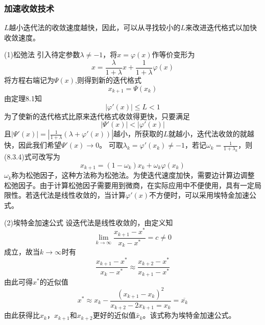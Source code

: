 \subsubsection{加速收敛技术}

$L$越小迭代法的收敛速度越快，因此，可以从寻找较小的$L$来改进迭代格式以加快收敛速度。

(1)松弛法
引入待定参数$\lambda \neq -1$，将$x = \varphi(x)$作等价变形为
\begin{equation}
    x = \frac{\lambda}{1+\lambda}x+\frac{1}{1+\lambda}\varphi(x)
\end{equation}
将方程右端记为$\varPsi(x)$,则得到新的迭代格式
\begin{equation*}
    x_{k+1} = \varPsi(x_k)
\end{equation*}
由定理8.1知
\begin{equation*}
    |\varphi'(x)| \leq L < 1
\end{equation*}
为了使新的迭代格式比原来迭代格式收敛得更快，只要满足
\begin{equation*}
    |\varPsi'(x)|<|\varphi'(x)|
\end{equation*}
且$|\varPsi'(x)| = |\frac{1}{1+\lambda}(\lambda+\varphi'(x))|$越小，所获取的$L$就越小，迭代法收敛的就越快，因此我们希望$\varPsi'(x) \rightarrow 0$。
可取$\lambda_k = \varphi'(x_k) \neq -1$，若记$\omega_k = \frac{1}{1+\lambda_k}$，则(8.3.4)式可改写为
\begin{equation*}
    x_{k+1} = (1-\omega_k)x_k+\omega_k\varphi(x_k)
\end{equation*}
$\omega_k$称为松弛因子，这种方法称为松弛法。为使迭代速度加快，需要边计算边调整松弛因子。由于计算松弛因子需要用到微商，在实际应用中不便使用，具有一定局限性。若迭代法是线性收敛的，当计算$\varphi'(x)$不方便时，可以采用埃特金加速公式。

(2)埃特金加速公式
设迭代法是线性收敛的，由定义知
\begin{equation*}
    \lim_{k \to \infty}\frac{x_{k+1}-x^*}{x_k-x^*}=c \neq 0
\end{equation*}
成立，故当$k \to \infty$时有
\begin{equation*}
    \frac{x_{k+1}-x^*}{x_k-x^*} \approx \frac{x_{k+2}-x^*}{x_{k+1}-x^*}
\end{equation*}
由此可得$x^*$的近似值
\begin{equation}
    x^* \approx x_k-\frac{(x_{k+1}-x_k)^2}{x_{k+2}-2x_{k+1}=x_k} = \overline{x_k}
\end{equation}
由此获得比$x_k$，$x_{k+1}$和$x_{k+2}$更好的近似值$\bar{x}_k$。该式称为埃特金加速公式。

